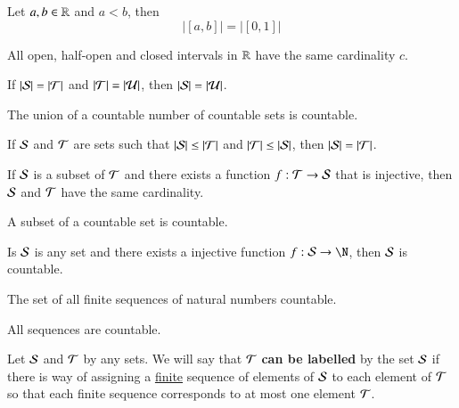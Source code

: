 \documentclass[11pt]{article}
\begin{document}
		\begin{theorem}[10.2.4]
			Let $a, b \in \mathbb{R}$ and $a < b$, then
			\[
				|[a,b]| = |[0,1]|
			\]
		\end{theorem}
		
		\begin{theorem}
			All open, half-open and closed intervals in $\mathbb{R}$ have the same cardinality $c$.
		\end{theorem}
		
		\begin{theorem}[10.2.7]
			If $|\mathcal{{S}}| = |\mathcal{{T}}|$ and $|\mathcal{{T}}| = |\mathcal{{U}}|$, then $|\mathcal{{S}}| = |\mathcal{{U}}|$.
		\end{theorem}
		
		\begin{theorem}[10.2.10]
			The union of a countable number of countable sets is countable.
		\end{theorem}
		
		\begin{theorem} If $\mathcal{{S}}$ and $\mathcal{{T}}$ are sets such that $|\mathcal{{S}}| \leq |\mathcal{{T}}|$ and $|\mathcal{{T}}| \leq |\mathcal{{S}}|$, then $|\mathcal{{S}}| = |\mathcal{{T}}|$.
		\end{theorem}
		
		\begin{corollary}[10.3.6]
			If $\mathcal{{S}}$ is a subset of $\mathcal{{T}}$ and there exists a function $f: \mathcal{{T}} \to \mathcal{{S}}$ that is injective, then $\mathcal{{S}}$ and $\mathcal{{T}}$ have the same cardinality.
		\end{corollary}
		
		\begin{theorem}
		    A subset of a countable set is countable.
		\end{theorem}
		
		\begin{corollary}[10.3.10]
		    Is $\mathcal{{S}}$ is any set and there exists a injective function $f: \mc{S} \to \N$, then $\mathcal{{S}}$ is countable.
		\end{corollary}
		
		\begin{theorem}[10.3.12]
		    The set of all finite sequences of natural numbers countable.
		\end{theorem}
		
		\begin{remark}
		    All sequences are countable.
		\end{remark}
		
		\begin{definition}[10.3.14]
		    Let $\mathcal{{S}}$ and $\mathcal{{T}}$ by any sets. We will say that $\mathcal{{T}}$ \textbf{can be labelled} by the set $\mathcal{{S}}$ if there is way of assigning a \ul{finite} sequence of elements of $\mathcal{{S}}$ to each element of $\mathcal{{T}}$ so that each finite sequence corresponds to at most one element $\mathcal{{T}}$.
		\end{definition}
		
\end{document}
